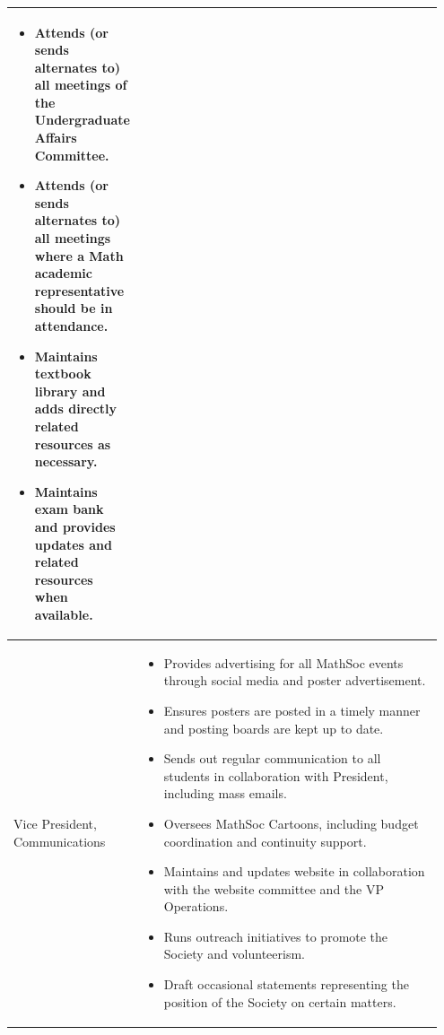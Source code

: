 \begin{longtable}{p{0.2\linewidth} p{0.75\linewidth}}
\begin{itemize}
\item Attends (or sends alternates to) all meetings of the Undergraduate Affairs Committee.
\item Attends (or sends alternates to) all meetings where a Math academic representative should be in attendance.
\item Maintains textbook library and adds directly related resources as necessary.
\item Maintains exam bank and provides updates and related resources when available.
\end{itemize}
\\
\midrule
Vice President, Communications &
\begin{itemize}
\item Provides advertising for all MathSoc events through social media and poster advertisement.
\item Ensures posters are posted in a timely manner and posting boards are kept up to date.
\item Sends out regular communication to all students in collaboration with President, including mass emails.
\item Oversees MathSoc Cartoons, including budget coordination and continuity support.
\item Maintains and updates website in collaboration with the website committee and the VP Operations.
\item Runs outreach initiatives to promote the Society and volunteerism.
\item Draft occasional statements representing the position of the Society on certain matters.
\end{itemize}
\\
\bottomrule
\end{longtable}
